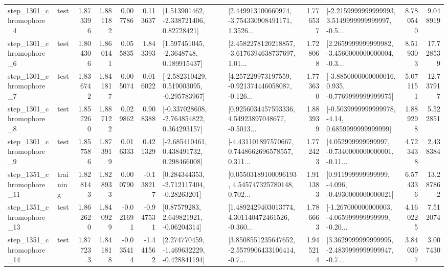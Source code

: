 \begin{tabular}{llrrrrllrlrr}
  step\_1301\_chromophore\_4 &      test &      1.873396 &    1.881182 &      0.007786 &  0.113637 &     [1.513901462, -2.338721406, 0.82728421] &  [2.449913100660974, -3.754330908491171, 1.3526... &       1.776537 &  [-2.2159999999999993, 3.5149999999999997, -0.5... &            8.780540 &          9.048919 \\
  step\_1301\_chromophore\_6 &      test &      1.804306 &    1.860141 &      0.055835 &  1.843393 &      [1.597451045, -2.3648748, 0.189915437] &  [2.4582278120218857, -3.6176394638737697, 1.01... &       1.728068 &  [2.2659999999999982, -3.4560000000000004, -0.3... &            8.519303 &         17.728539 \\
  step\_1301\_chromophore\_7 &      test &      1.836742 &    1.841817 &      0.005074 &  0.016022 &   [-2.582310429, 0.519003095, -0.295783967] &  [4.257229973197559, -0.921374446058087, -0.126... &       1.773630 &  [-3.8850000000000016, 0.935, -0.7769999999999975] &            5.071151 &         12.737917 \\
  step\_1301\_chromophore\_8 &      test &      1.857260 &    1.887122 &      0.029862 &  0.908388 &   [-0.337028608, -2.764854822, 0.364293157] &  [0.9256034457593336, 4.54923897048677, -0.5013... &       1.883939 &   [-0.5039999999999978, -4.14, 0.6859999999999999] &            1.889298 &          5.522851 \\
  step\_1301\_chromophore\_9 &      test &      1.857586 &    1.873919 &      0.016333 &  0.421329 &    [-2.685410461, 0.438491732, 0.298466008] &  [-4.431101897570667, 0.7448662696578557, 0.311... &       1.772423 &  [4.052999999999997, -0.7340000000000001, -0.11... &            4.723438 &          2.438384 \\
 step\_1351\_chromophore\_11 &  training &      1.828143 &    1.828933 &      0.000790 & -0.138217 &    [0.284344353, -2.712117404, -0.28263201] &  [0.05503189100096193, 4.545747325780148, 0.702... &       1.911383 &   [0.911999999999999, -4.096, -0.4930000000000021] &            6.574336 &         13.287862 \\
 step\_1351\_chromophore\_13 &      test &      1.862620 &    1.840929 &     -0.021691 & -0.947531 &      [0.87579283, 2.649821921, -0.06204314] &  [1.4892429403013774, 4.301140472461526, -0.360... &       1.786663 &  [-1.267000000000003, -4.065999999999999, -0.20... &            4.160225 &          7.512074 \\
 step\_1351\_chromophore\_14 &      test &      1.877233 &    1.841818 &     -0.035414 & -1.441562 &   [2.274770459, -1.469632229, -0.428841194] &  [3.8508551235647652, -2.5579906433106414, -0.7... &       1.945214 &  [3.3629999999999995, -2.4839999999999947, -0.7... &            3.840397 &          3.007430 \\

\end{tabular}
